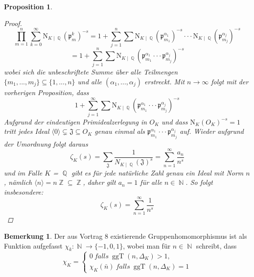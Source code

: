 \documentclass[10pt,a4paper]{article}
\theoremstyle{plain}
\newtheorem{prop}[thm]{Proposition}
\theoremstyle{definition}
\newtheorem*{note}{Bemerkung}
\theoremstyle{remark}
\DeclareMathOperator{\Q}{\mathbb{Q}}
\DeclareMathOperator{\Z}{\mathbb{Z}}
\DeclareMathOperator{\N}{\mathbb{N}}
\DeclareMathOperator{\ggT}{ggT}
\begin{document}
\begin{prop}
\begin{proof}
$$\prod_{m=1}^{n}\sum_{k=0}^{\infty}\mathrm{N}_{K\mid \Q}(\mathfrak{p}_m^k)^{-s}=1+\sum_{j=1}^{n}\sum \mathrm{N}_{K\mid \Q}(\mathfrak{p}_{m_1}^{\alpha_1})^{-s}\cdot\cdot\cdot \mathrm{N}_{K\mid \Q}(\mathfrak{p}_{m_j}^{\alpha_j})^{-s}$$ $$=1+\sum_{j=1}^{n}\sum \mathrm{N}_{K\mid \Q}(\mathfrak{p}_{m_1}^{\alpha_1}\cdot\cdot\cdot\mathfrak{p}_{m_j}^{\alpha_j})^{-s}$$
wobei sich die unbeschriftete Summe über alle Teilmengen $\{m_{1},...,m_{j}\}\subseteq \{ 1,...,n\}$ und alle $(\alpha_1,...,\alpha_j)$ erstreckt. Mit $n \rightarrow \infty$ folgt mit der vorherigen Proposition, dass $$1+\sum_{j=1}^{\infty}\sum \mathrm{N}_{K\mid \Q}(\mathfrak{p}_{m_1}^{\alpha_1}\cdot\cdot\cdot\mathfrak{p}_{m_j}^{\alpha_j})^{-s}$$
Aufgrund der eindeutigen Primidealzerlegung in $O_K$ und dass $\mathrm{N}_K(O_K)^{-s}=1$ tritt jedes Ideal $\langle0\rangle\subsetneq \mathfrak{J} \subseteq O_{\textit{K}}$ genau einmal als $\mathfrak{p}_{m_1}^{\alpha_1}\cdot\cdot\cdot\mathfrak{p}_{m_j}^{\alpha_j}$ auf. Wieder aufgrund der Umordnung folgt daraus $$\zeta_{K}(s) = \sum_{\mathfrak{J}}\frac{1}{N_{K\mid\Q}(\mathfrak{J})^s}=\sum_{n=1}^{\infty}\frac{a_n}{n^s}$$ und im Falle $\textit{K}$ = $\Q$ gibt es für jede natürliche Zahl genau ein Ideal mit Norm $n$, nämlich $\langle n\rangle=n\Z\subseteq \Z$, daher gilt $a_n=1$ für alle $n\in \N$. So folgt insbesondere: $$\zeta_K{(s)}= \sum_{n=1}^{\infty}\frac{1}{n^s}$$

\end{proof}
\end{prop}

\begin{note}

Der aus Vortrag 8 existierende Gruppenhomomorphismus ist als Funktion aufgefasst $\chi_k \colon \N \rightarrow \{-1,0,1 \}$, wobei man für $n \in \N$ schreibt, dass $$\chi_K=\begin{cases}0 \ falls \ \ggT(n,\Delta_K) >1,\\\chi_{K}(\bar{n})\ falls\ \ggT(n,\Delta_K) =1\end{cases}$$

\end{note}
\end{document}
